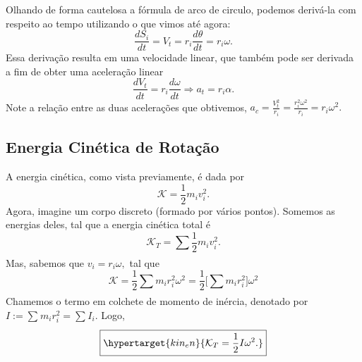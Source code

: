 \documentclass[physicsII_notes.tex]{subfiles}
\begin{document}
Olhando de forma cautelosa a fórmula de arco de circulo, podemos derivá-la com respeito ao tempo utilizando o que vimos até agora:
\[
	\frac{dS_{i}}{dt} = V_{t} = r_{i}\frac{d\theta }{dt} = r_{i}\omega.
\]
Essa derivação resulta em uma velocidade linear, que também pode ser derivada a fim de obter uma aceleração linear
\[
	\frac{dV_{t}}{dt} = r_{i}\frac{d\omega }{dt} \Rightarrow a_{t} = r_{i}\alpha.
\]
Note a relação entre as duas acelerações que obtivemos, \(a_{c} = \frac{V_{t}^{2}}{r_{i}}= \frac{r_{i}^{2}\omega^{2}}{r_{i}} = r_{i}\omega^{2}.\)

\subsection{Energia Cinética de Rotação}
A energia cinética, como vista previamente, é dada por
\[
	\mathcal{K} = \frac{1}{2}m_{i}v_{i}^{2}.
\]
Agora, imagine um corpo discreto (formado por vários pontos). Somemos as energias deles, tal que a energia cinética total é
\[
	\mathcal{K}_{T} = \sum\limits_{}^{}\frac{1}{2}m_{i}v_{i}^{2}.
\]
Mas, sabemos que \(v_{i} = r_{i}\omega, \) tal que
\[
	\mathcal{K} = \frac{1}{2}\sum\limits_{}^{}m_{i}r_{i}^{2}\omega^{2} = \frac{1}{2}\biggl[\sum\limits_{}^{}m_{i}r_{i}^{2}\biggr]\omega^{2}
\]
Chamemos o termo em colchete de momento de inércia, denotado por \(I:= \sum\limits_{}^{}m_{i}r_{i}^{2} = \sum\limits_{}^{}I_{i}\). Logo,
\[
	\boxed{\hypertarget{kin_en}{\mathcal{K}_{T} = \frac{1}{2}I\omega^{2}.}}
\]
\end{document}
